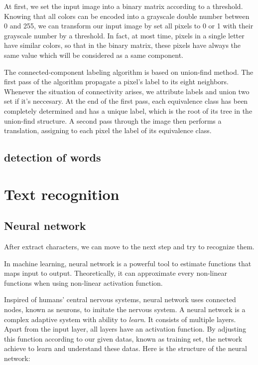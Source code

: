 \documentclass[paper=a4, french, 11pt]{scrartcl}
\begin{document}
At first, we set the input image into a binary matrix according to a threshold. Knowing that all colors can be encoded into a grayscale double number between 0 and 255, we can transform our input image by set all pixels to 0 or 1 with their grayscale number by a threshold. In fact, at most time, pixels in a single letter have similar colors, so that in the binary matrix, these pixels have always the same value which will be considered as a same component.

The connected-component labeling algorithm is based on union-find method. The first pass of the algorithm propagate a pixel's label to its eight neighbors. Whenever the situation of connectivity arises, we attribute labels and union two set if it's neccesary. At the end of the first pass, each equivalence class has been completely determined and has a unique label, which is the root of its tree in the union-find structure. A second pass through the image then performs a translation, assigning to each pixel the label of its equivalence class.

\subsection{detection of words}

\section{Text recognition}
\subsection{Neural network}
After extract characters, we can move to the next step and try to recognize them.

In machine learning, neural network is a powerful tool to estimate functions that maps input to output. Theoretically, it can approximate every non-linear functions when using non-linear activation function. 

Inspired of humans' central nervous systems, neural network uses connected nodes, known as neurons, to imitate the nervous system. A neural network is a complex adaptive system with ability to \textit{learn}. It consists of multiple layers. Apart from the input layer, all layers have an activation function. By adjusting this function according to our given datas, known as training set, the network achieve to learn and understand these datas. Here is the structure of the neural network:
\end{document}
